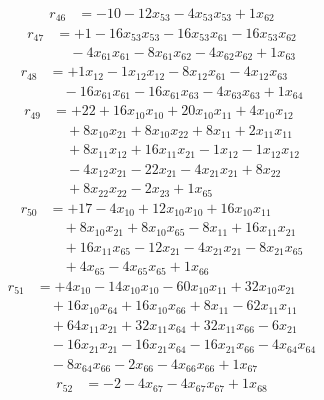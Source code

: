 \[\begin{aligned}
r_{46} &= - 10 - 12 x_{53} - 4 x_{53} x_{53} + 1 x_{62}
\end{aligned}\]
\[\begin{aligned}
r_{47} &= + 1 - 16 x_{53} x_{53} - 16 x_{53} x_{61} - 16 x_{53} x_{62} \\
 &\quad - 4 x_{61} x_{61} - 8 x_{61} x_{62} - 4 x_{62} x_{62} + 1 x_{63}
\end{aligned}\]
\[\begin{aligned}
r_{48} &= + 1 x_{12} - 1 x_{12} x_{12} - 8 x_{12} x_{61} - 4 x_{12} x_{63} \\
 &\quad - 16 x_{61} x_{61} - 16 x_{61} x_{63} - 4 x_{63} x_{63} + 1 x_{64}
\end{aligned}\]
\[\begin{aligned}
r_{49} &= + 22 + 16 x_{10} x_{10} + 20 x_{10} x_{11} + 4 x_{10} x_{12} \\
 &\quad + 8 x_{10} x_{21} + 8 x_{10} x_{22} + 8 x_{11} + 2 x_{11} x_{11} \\
 &\quad + 8 x_{11} x_{12} + 16 x_{11} x_{21} - 1 x_{12} - 1 x_{12} x_{12} \\
 &\quad - 4 x_{12} x_{21} - 22 x_{21} - 4 x_{21} x_{21} + 8 x_{22} \\
 &\quad + 8 x_{22} x_{22} - 2 x_{23} + 1 x_{65}
\end{aligned}\]
\[\begin{aligned}
r_{50} &= + 17 - 4 x_{10} + 12 x_{10} x_{10} + 16 x_{10} x_{11} \\
 &\quad + 8 x_{10} x_{21} + 8 x_{10} x_{65} - 8 x_{11} + 16 x_{11} x_{21} \\
 &\quad + 16 x_{11} x_{65} - 12 x_{21} - 4 x_{21} x_{21} - 8 x_{21} x_{65} \\
 &\quad + 4 x_{65} - 4 x_{65} x_{65} + 1 x_{66}
\end{aligned}\]
\[\begin{aligned}
r_{51} &= + 4 x_{10} - 14 x_{10} x_{10} - 60 x_{10} x_{11} + 32 x_{10} x_{21} \\
 &\quad + 16 x_{10} x_{64} + 16 x_{10} x_{66} + 8 x_{11} - 62 x_{11} x_{11} \\
 &\quad + 64 x_{11} x_{21} + 32 x_{11} x_{64} + 32 x_{11} x_{66} - 6 x_{21} \\
 &\quad - 16 x_{21} x_{21} - 16 x_{21} x_{64} - 16 x_{21} x_{66} - 4 x_{64} x_{64} \\
 &\quad - 8 x_{64} x_{66} - 2 x_{66} - 4 x_{66} x_{66} + 1 x_{67}
\end{aligned}\]
\[\begin{aligned}
r_{52} &= - 2 - 4 x_{67} - 4 x_{67} x_{67} + 1 x_{68}
\end{aligned}\]
